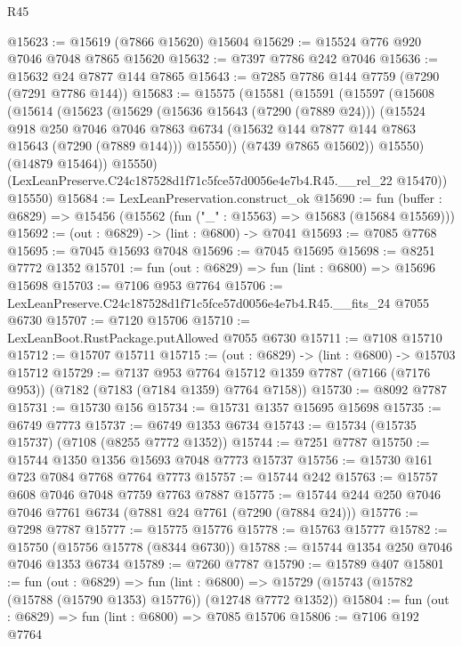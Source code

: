 \begin{lexlean}{R45}
\begin{coremodule}
{@15623 := @15619 (@7866 @15620) @15604
@15629 := @15524 @776 @920 @7046 @7048 @7865 @15620
@15632 := @7397 @7786 @242 @7046
@15636 := @15632 @24 @7877 @144 @7865
@15643 := @7285 @7786 @144 @7759 (@7290 (@7291 @7786 @144))
@15683 := @15575
    (@15581
      (@15591
        (@15597
          (@15608
            (@15614
              (@15623
                (@15629
                  (@15636 @15643 (@7290 (@7889 @24)))
                  (@15524
                    @918
                    @250
                    @7046
                    @7046
                    @7863
                    @6734
                    (@15632 @144 @7877 @144 @7863 @15643 (@7290 (@7889 @144)))
                    @15550))
                (@7439 @7865 @15602))
              @15550)
            (@14879 @15464))
          @15550)
        (LexLeanPreserve.C24c187528d1f71c5fce57d0056e4e7b4.R45.__rel_22 @15470))
      @15550)
@15684 := LexLeanPreservation.construct_ok
@15690 := fun (buffer : @6829) => @15456 (@15562 (fun ("_" : @15563) => @15683 (@15684 @15569)))
@15692 := (out : @6829) -> (lint : @6800) -> @7041
@15693 := @7085 @7768
@15695 := @7045 @15693 @7048
@15696 := @7045 @15695
@15698 := @8251 @7772 @1352
@15701 := fun (out : @6829) => fun (lint : @6800) => @15696 @15698
@15703 := @7106 @953 @7764
@15706 := LexLeanPreserve.C24c187528d1f71c5fce57d0056e4e7b4.R45.__fits_24 @7055 @6730
@15707 := @7120 @15706
@15710 := LexLeanBoot.RustPackage.putAllowed @7055 @6730
@15711 := @7108 @15710
@15712 := @15707 @15711
@15715 := (out : @6829) -> (lint : @6800) -> @15703 @15712
@15729 := @7137
    @953
    @7764
    @15712
    @1359
    @7787
    (@7166 (@7176 @953))
    (@7182 (@7183 (@7184 @1359) @7764 @7158))
@15730 := @8092 @7787
@15731 := @15730 @156
@15734 := @15731 @1357 @15695 @15698
@15735 := @6749 @7773
@15737 := @6749 @1353 @6734
@15743 := @15734 (@15735 @15737) (@7108 (@8255 @7772 @1352))
@15744 := @7251 @7787
@15750 := @15744 @1350 @1356 @15693 @7048 @7773 @15737
@15756 := @15730 @161 @723 @7084 @7768 @7764 @7773
@15757 := @15744 @242
@15763 := @15757 @608 @7046 @7048 @7759 @7763 @7887
@15775 := @15744 @244 @250 @7046 @7046 @7761 @6734 (@7881 @24 @7761 (@7290 (@7884 @24)))
@15776 := @7298 @7787
@15777 := @15775 @15776
@15778 := @15763 @15777
@15782 := @15750 (@15756 @15778 (@8344 @6730))
@15788 := @15744 @1354 @250 @7046 @7046 @1353 @6734
@15789 := @7260 @7787
@15790 := @15789 @407
@15801 := fun (out : @6829) =>
  fun (lint : @6800) => @15729 (@15743 (@15782 (@15788 (@15790 @1353) @15776)) (@12748 @7772 @1352))
@15804 := fun (out : @6829) => fun (lint : @6800) => @7085 @15706
@15806 := @7106 @192 @7764
}
\end{coremodule}
\end{lexlean}

